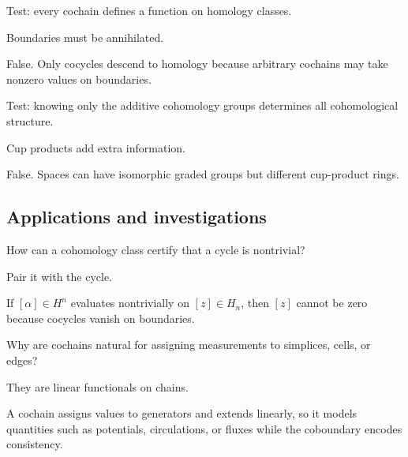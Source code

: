 \begin{exercise}\label{exr:viii28-ped-11}
Test: every cochain defines a function on homology classes.
\end{exercise}
\begin{hint}
Boundaries must be annihilated.
\end{hint}
\begin{solution}
False. Only cocycles descend to homology because arbitrary cochains may take nonzero values on boundaries.
\end{solution}

\begin{exercise}\label{exr:viii28-ped-12}
Test: knowing only the additive cohomology groups determines all cohomological structure.
\end{exercise}
\begin{hint}
Cup products add extra information.
\end{hint}
\begin{solution}
False. Spaces can have isomorphic graded groups but different cup-product rings.
\end{solution}

\subsection*{Applications and investigations}

\begin{exercise}\label{exr:viii28-ped-13}
How can a cohomology class certify that a cycle is nontrivial?
\end{exercise}
\begin{hint}
Pair it with the cycle.
\end{hint}
\begin{solution}
If $[\alpha]\in H^n$ evaluates nontrivially on $[z]\in H_n$, then $[z]$ cannot be zero because cocycles vanish on boundaries.
\end{solution}

\begin{exercise}\label{exr:viii28-ped-14}
Why are cochains natural for assigning measurements to simplices, cells, or edges?
\end{exercise}
\begin{hint}
They are linear functionals on chains.
\end{hint}
\begin{solution}
A cochain assigns values to generators and extends linearly, so it models quantities such as potentials, circulations, or fluxes while the coboundary encodes consistency.
\end{solution}

